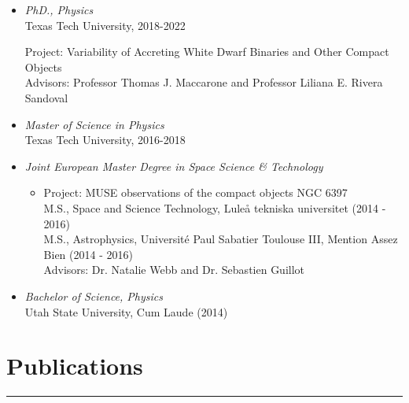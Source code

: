 \documentclass[letterpaper,10pt]{article}
\begin{document}
\begin{itemize}[label=$\blacktriangleright$]



  \item \emph{PhD., Physics}  \\
   Texas Tech University, 2018-2022
      \begin{itemize}[label=]
     Project: Variability of Accreting White Dwarf Binaries and Other Compact Objects  \\
     Advisors: Professor Thomas J. Maccarone and Professor Liliana E. Rivera Sandoval 
      \end{itemize}





  \item \emph{Master of Science in Physics}  \\
   Texas Tech University, 2016-2018



  \item \emph{Joint European Master Degree in Space Science \& Technology} 
  \begin{itemize}[label=]
      \vspace{-.05cm}
      \item Project: MUSE observations of the compact objects NGC 6397 \\
      M.S., Space and Science Technology, Lule\r a tekniska universitet  (2014 - 2016) \\
      M.S., Astrophysics, Universit\'e Paul Sabatier Toulouse III, Mention Assez Bien (2014 - 2016) \\
      Advisors: Dr. Natalie Webb and Dr. Sebastien Guillot
  \end{itemize}




  \item \emph{Bachelor of Science, Physics}  \\
   Utah State University, Cum Laude (2014)

\end{itemize}







\section*{Publications }%
\hrule
\vspace{.3 cm}
\end{document}
